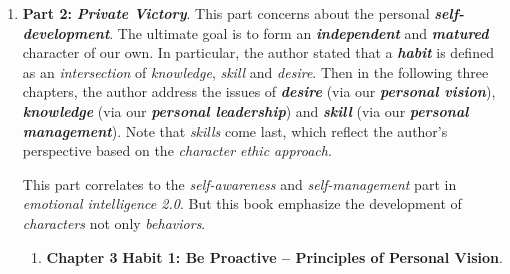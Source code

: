 \documentclass[11pt]{article}
\begin{document}
\begin{enumerate}
\item \textbf{Part 2: } \emph{\textbf{Private Victory}}. This part concerns about the personal \emph{\textbf{self-development}}. The ultimate goal is to form an \emph{\textbf{independent}} and \emph{\textbf{matured}} character of our own.  In particular, the author stated that a \emph{\textbf{habit}} is defined as an \emph{intersection} of \emph{knowledge}, \emph{skill} and \emph{desire}. Then in the following three chapters, the author address the issues of \emph{\textbf{desire}} (via our \emph{\textbf{personal vision}}), \emph{\textbf{knowledge}} (via our \emph{\textbf{personal leadership}}) and \emph{\textbf{skill}} (via our \emph{\textbf{personal management}}). Note that \emph{skills} come last, which reflect the author's perspective based on the \emph{character ethic approach}.

This part correlates to the \emph{self-awareness} and \emph{self-management} part in \emph{emotional intelligence 2.0}. But this book emphasize the development of \emph{characters} not only \emph{behaviors}.

\begin{enumerate}
\item \textbf{Chapter 3} \textbf{Habit 1: Be Proactive -- Principles of Personal Vision}. 


\end{enumerate}
\end{enumerate}
\end{document}
